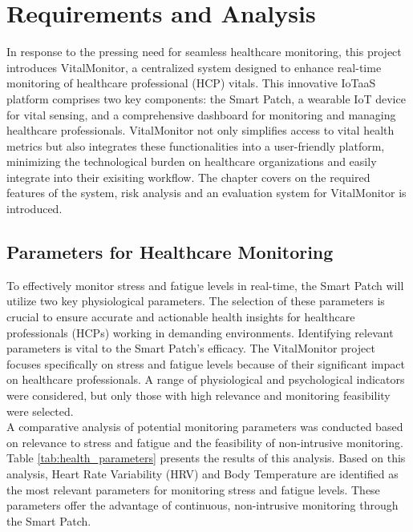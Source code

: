 \newpage

\chapter{Requirements and Analysis}
In response to the pressing need for seamless healthcare monitoring, this project introduces VitalMonitor, a centralized system designed to enhance real-time monitoring of healthcare professional (HCP) vitals. This innovative IoTaaS platform comprises two key components: the Smart Patch, a wearable IoT device for vital sensing, and a comprehensive dashboard for monitoring and managing healthcare professionals. VitalMonitor not only simplifies access to vital health metrics but also integrates these functionalities into a user-friendly platform, minimizing the technological burden on healthcare organizations and easily integrate into their exisiting workflow. The chapter covers on the required features of the system, risk analysis and an evaluation system for VitalMonitor is introduced.

\section{Parameters for Healthcare Monitoring}

To effectively monitor stress and fatigue levels in real-time, the Smart Patch will utilize two key physiological parameters. The selection of these parameters is crucial to ensure accurate and actionable health insights for healthcare professionals (HCPs) working in demanding environments. Identifying relevant parameters is vital to the Smart Patch's efficacy. The VitalMonitor project focuses specifically on stress and fatigue levels because of their significant impact on healthcare professionals. A range of physiological and psychological indicators were considered, but only those with high relevance and monitoring feasibility were selected. \\ 

\noindent A comparative analysis of potential monitoring parameters was conducted based on relevance to stress and fatigue and the feasibility of non-intrusive monitoring. Table \ref{tab:health_parameters} presents the results of this analysis. Based on this analysis, Heart Rate Variability (HRV) and Body Temperature are identified as the most relevant parameters for monitoring stress and fatigue levels. These parameters offer the advantage of continuous, non-intrusive monitoring through the Smart Patch. \\ \\ \\

